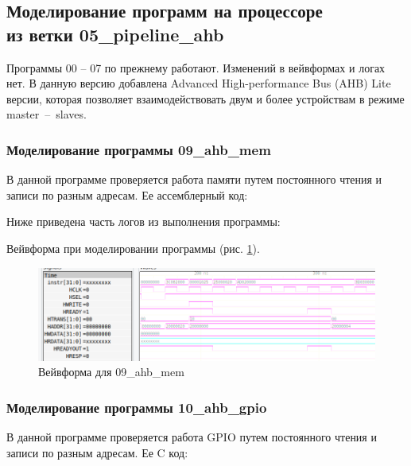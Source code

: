 \documentclass[a4paper,14pt]{article}
\begin{document}
	\subsection{Моделирование программ на процессоре \\ из ветки 05\_pipeline\_ahb}
	
	Программы 00 -- 07 по прежнему работают. Изменений в вейвформах и логах нет.
	В данную версию добавлена Advanced High-performance Bus (AHB) Lite версии,
	которая позволяет взаимодействовать двум и более устройствам в режиме master~--~slaves.
	
	\subsubsection{Моделирование программы 09\_ahb\_mem}
	
	В данной программе проверяется работа памяти путем постоянного чтения и записи по разным адресам.
	Ее ассемблерный код:
	
	{\small {}}
	
	Ниже приведена часть логов из выполнения программы:
	
	{\small {}}
	
	Вейвформа при моделировании программы (рис. \ref{fig:05_09_wvf}).
	
	\begin{figure}[H]
		\centering
		\includegraphics[width=\linewidth]{images/05_09_wvf}
		\caption{Вейвформа для  09\_ahb\_mem}
		\label{fig:05_09_wvf}
	\end{figure}

	\subsubsection{Моделирование программы 10\_ahb\_gpio}

	В данной программе проверяется работа GPIO путем постоянного чтения и записи по разным адресам.
	Ее C код:
	
	{\small {}}
	
\end{document}
